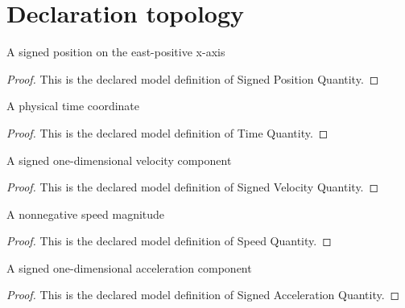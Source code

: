 \section{Declaration topology}
\begin{definition}
  \label{def:physics:phyx-mini-0793:phyxminiproblems-problemphyxmini0793-signedpositionquantity}
  A signed position on the east-positive x-axis
\end{definition}
\begin{proof}
  This is the declared model definition of Signed Position Quantity.
\end{proof}
\begin{definition}
  \label{def:physics:phyx-mini-0793:phyxminiproblems-problemphyxmini0793-timequantity}
  A physical time coordinate
\end{definition}
\begin{proof}
  This is the declared model definition of Time Quantity.
\end{proof}
\begin{definition}
  \label{def:physics:phyx-mini-0793:phyxminiproblems-problemphyxmini0793-signedvelocityquantity}
  A signed one-dimensional velocity component
\end{definition}
\begin{proof}
  This is the declared model definition of Signed Velocity Quantity.
\end{proof}
\begin{definition}
  \label{def:physics:phyx-mini-0793:phyxminiproblems-problemphyxmini0793-speedquantity}
  A nonnegative speed magnitude
\end{definition}
\begin{proof}
  This is the declared model definition of Speed Quantity.
\end{proof}
\begin{definition}
  \label{def:physics:phyx-mini-0793:phyxminiproblems-problemphyxmini0793-signedaccelerationquantity}
  A signed one-dimensional acceleration component
\end{definition}
\begin{proof}
  This is the declared model definition of Signed Acceleration Quantity.
\end{proof}
